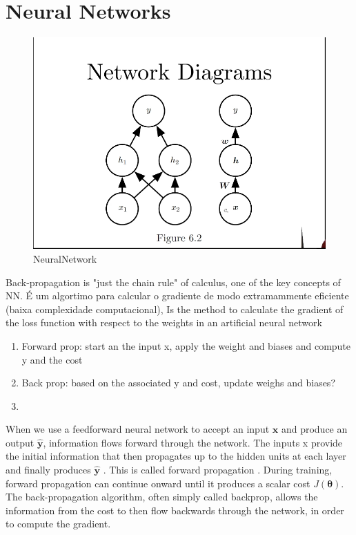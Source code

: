 
\section{Neural Networks}

\begin{figure}[H]
\centering
\caption{NeuralNetwork}
\includegraphics[scale=0.5]{Figures/network-diagram.PNG}
\end{figure}

Back-propagation is "just the chain rule" of calculus, one of the key concepts of NN. É um algortimo para calcular o gradiente de modo extramammente eficiente (baixa complexidade computacional), Is the method to calculate the gradient of the loss function with respect to the weights in an artificial neural network

\begin{enumerate}
    \item Forward prop: start an the input x, apply the weight and biases and compute y and the cost
    \item Back prop: based on the  associated y and cost, update weighs and biases?
    \item
\end{enumerate}

When we use a feedforward neural network to accept an input $\boldsymbol{x}$ and produce an
output $\hat{\boldsymbol{y}}$, information flows forward through the network. The inputs x provide
the initial information that then propagates up to the hidden units at each layer
and finally produces $\hat{\boldsymbol{y}}$ . This is called forward propagation . During training,
forward propagation can continue onward until it produces a scalar cost $J (\boldsymbol{\theta})$.
The back-propagation algorithm,  often simply called backprop, allows the information from the cost to then flow backwards through
the network, in order to compute the gradient.



